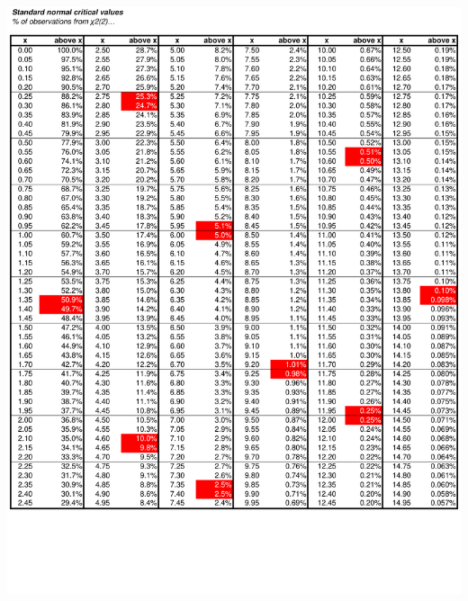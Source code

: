 \documentclass[8pt,letterpaper, landscape]{extarticle} %
\begin{document}
\begin{center}
\includegraphics[height=9.75in, angle=90]{cv4}

\end{center}
\end{document}
